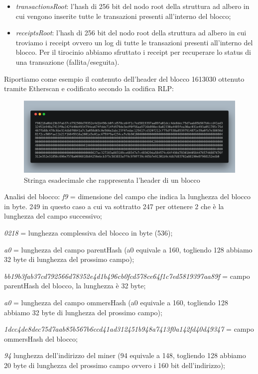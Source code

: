 \documentclass[12pt]{report}
\begin{document}
\begin{itemize}
\item \textit{transactionsRoot}: l'hash di 256 bit del nodo root della struttura ad albero in cui vengono inserite tutte le transazioni presenti all'interno del blocco;
\item \textit{receiptsRoot}: l'hash di 256 bit del nodo root della struttura ad albero in cui troviamo i receipt ovvero un log di tutte le transazioni presenti all'interno del blocco. Per il tirocinio abbiamo sfruttato i receipt per recuperare lo status di una transazione (fallita/eseguita).
\end{itemize}

Riportiamo come esempio il contenuto dell'header del blocco 1613030 ottenuto tramite Etherscan\cite{Etherscan} e codificato secondo la codifica RLP:
\begin{figure}[H]
    \includegraphics[width=\textwidth]{carbon-7}
    \caption{Stringa esadecimale che rappresenta l'header di un blocco}
\end{figure}
\newpage
Analisi del blocco:
\newline
\textit{f9} = dimensione del campo che indica la lunghezza del blocco in byte.
249 in questo caso a cui va sottratto 247 per ottenere 2 che è la lunghezza del campo successivo;

\textit{0218} = lunghezza complessiva del blocco in byte (536);

\textit{a0} = lunghezza del campo parentHash (a0 equivale a 160, togliendo 128 abbiamo 32 byte di lunghezza del prossimo campo);

\textit{bb19b3fab37cd792566d78352e4d1b496cb0fcd578ce64f1c7ed5819397aa89f} = campo parentHash del blocco, la lunghezza è 32 byte;

\textit{a0} = lunghezza del campo ommersHash (a0 equivale a 160, togliendo 128 abbiamo 32 byte di lunghezza del prossimo campo);

\textit{1dcc4de8dec75d7aab85b567b6ccd41ad312451b948a7413f0a142fd40d49347} = campo ommersHash del blocco;

\textit{94} lunghezza dell'indirizzo del miner (94 equivale a 148, togliendo 128 abbiamo 20 byte di lunghezza del prossimo campo ovvero i 160 bit dell'indirizzo);
\end{document}
